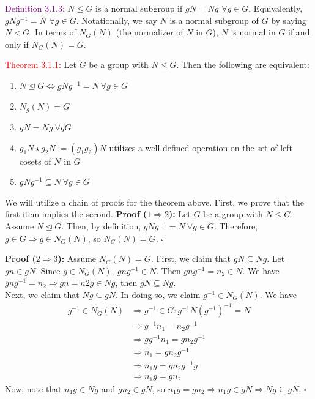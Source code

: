 \documentclass{article}
\begin{document}
\textcolor{purple}{Definition 3.1.3:} $N \leq G$ is a normal subgroup if $gN = Ng$ $\forall g \in G$. Equivalently, $gNg^{-1} = N$ $\forall g \in G$. 
Notationally, we say $N$ is a normal subgroup of $G$ by saying $N \vartriangleleft G$. In terms of $N_G(N)$ (the normalizer of $N$ in $G$), $N$ 
is normal in $G$ if and only if $N_G(N) = G$.

\textcolor{red}{Theorem 3.1.1:} Let $G$ be a group with $N \leq G$. Then the following are equivalent:
\begin{enumerate}
    \item $N \trianglelefteq G \Longleftrightarrow gNg^{-1} = N \ \forall g \in G$
    \item $N_g(N) = G$
    \item $gN=Ng \ \forall g G$
    \item $g_1N \star g_2N := (g_1g_2)N$ utilizes a well-defined operation on the set of left cosets of $N$ in $G$
    \item $gNg^{-1} \subseteq N \ \forall g \in G$
\end{enumerate}

We will utilize a chain of proofs for the theorem above. First, we prove that the first item implies the second.
\textbf{Proof ($1 \Longrightarrow 2$):} Let $G$ be a group with $N \leq G$. Assume $N \trianglelefteq G$. Then, by definition, 
$gNg^{-1} = N \ \forall g \in G$. Therefore, $g \in G \Longrightarrow g \in N_G(N)$, so $N_G(N) = G$. $\square$

\textbf{Proof ($2 \Longrightarrow 3$):} Assume $N_G(N) = G$. First, we claim that $gN \subseteq Ng$. Let $gn \in gN$. Since 
$g \in N_G(N), \ gng^{-1} \in N$. Then $gng^{-1} = n_2 \in N$. We have $gng^{-1} = n_2 \Longrightarrow gn = n2g \in Ng$, then 
$gN \subseteq Ng$.\\
Next, we claim that $Ng \subseteq gN$. In doing so, we claim $g^{-1} \in N_G(N)$. We have
\begin{align*}
    g^{-1} \in N_G(N) &\Longrightarrow g^{-1} \in G: g^{-1}N(g^{-1})^{-1} = N \\
    &\Longrightarrow g^{-1}n_1 = n_2g^{-1} \\
    &\Longrightarrow gg^{-1}n_1 = gn_2g^{-1} \\
    &\Longrightarrow n_1 = gn_2g^{-1} \\
    &\Longrightarrow n_1g = gn_2g^{-1}g \\
    &\Longrightarrow n_1g = gn_2  
\end{align*}
Now, note that $n_1g \in Ng$ and $gn_2 \in gN$, so $n_1g = gn_2 \Longrightarrow n_1g \in gN \Longrightarrow Ng \subseteq gN$. $\square$
\end{document}
